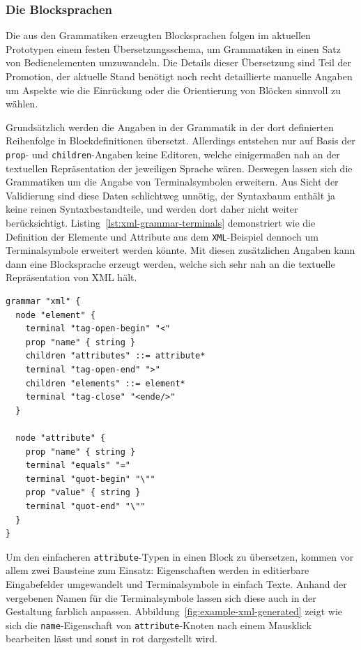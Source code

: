 \documentclass[paper=a4,fontsize=12pt,parskip=half]{scrartcl}
\begin{document}
\subsubsection{Die Blocksprachen}

Die aus den Grammatiken erzeugten Blocksprachen folgen im aktuellen Prototypen einem festen Übersetzungsschema, um Grammatiken in einen Satz von Bedienelementen umzuwandeln. Die Details dieser Übersetzung sind Teil der Promotion, der aktuelle Stand benötigt noch recht detaillierte manuelle Angaben um Aspekte wie die Einrückung oder die Orientierung von Blöcken sinnvoll zu wählen.

Grundsätzlich werden die Angaben in der Grammatik in der dort definierten Reihenfolge in Blockdefinitionen übersetzt. Allerdings entstehen nur auf Basis der \texttt{prop}- und \texttt{children}-Angaben keine Editoren, welche einigermaßen nah an der textuellen Repräsentation der jeweiligen Sprache wären. Deswegen lassen sich die Grammatiken um die Angabe von Terminalsymbolen erweitern. Aus Sicht der Validierung sind diese Daten schlichtweg unnötig, der Syntaxbaum enthält ja keine reinen Syntaxbestandteile, und werden dort daher nicht weiter berücksichtigt. Listing~\ref{lst:xml-grammar-terminals} demonstriert wie die Definition der Elemente und Attribute aus dem \texttt{XML}-Beispiel dennoch um Terminalsymbole erweitert werden könnte. Mit diesen zusätzlichen Angaben kann dann eine Blocksprache erzeugt werden, welche sich sehr nah an die textuelle Repräsentation von XML hält.

\begin{lstlisting}[float=h, label={lst:xml-grammar-terminals},caption={Terminalsymbole für Attribute in \texttt{XML} },captionpos=b,language={Grammar}]
grammar "xml" {
  node "element" {
    terminal "tag-open-begin" "<"
    prop "name" { string }
    children "attributes" ::= attribute*
    terminal "tag-open-end" ">"
    children "elements" ::= element*
    terminal "tag-close" "<ende/>"
  }

  node "attribute" {
    prop "name" { string }
    terminal "equals" "="
    terminal "quot-begin" "\""
    prop "value" { string }
    terminal "quot-end" "\""
  }
}
\end{lstlisting}

Um den einfacheren \texttt{attribute}-Typen in einen Block zu übersetzen, kommen vor allem zwei Bausteine zum Einsatz: Eigenschaften werden in editierbare Eingabefelder umgewandelt und Terminalsymbole in einfach Texte. Anhand der vergebenen Namen für die Terminalsymbole lassen sich diese auch in der Gestaltung farblich anpassen. Abbildung~\ref{fig:example-xml-generated} zeigt wie sich die \texttt{name}-Eigenschaft von \texttt{attribute}-Knoten nach einem Mausklick bearbeiten lässt und sonst in rot dargestellt wird.
\end{document}
